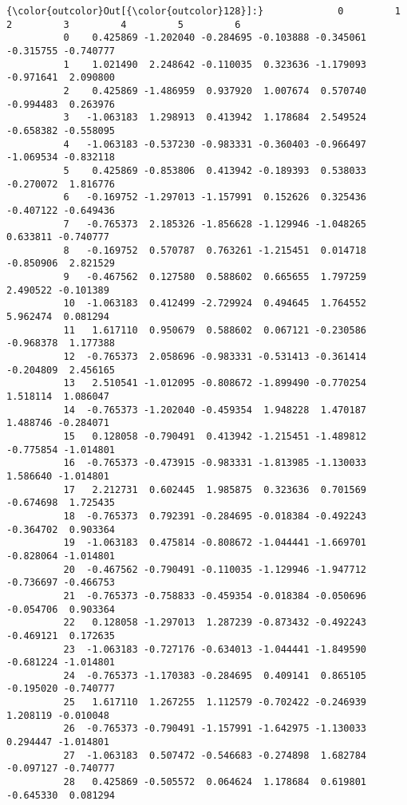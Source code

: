 \documentclass[11pt]{article}
\begin{document}
\begin{Verbatim}[commandchars=\\\{\}]
{\color{outcolor}Out[{\color{outcolor}128}]:}             0         1         2         3         4         5         6
          0    0.425869 -1.202040 -0.284695 -0.103888 -0.345061 -0.315755 -0.740777
          1    1.021490  2.248642 -0.110035  0.323636 -1.179093 -0.971641  2.090800
          2    0.425869 -1.486959  0.937920  1.007674  0.570740 -0.994483  0.263976
          3   -1.063183  1.298913  0.413942  1.178684  2.549524 -0.658382 -0.558095
          4   -1.063183 -0.537230 -0.983331 -0.360403 -0.966497 -1.069534 -0.832118
          5    0.425869 -0.853806  0.413942 -0.189393  0.538033 -0.270072  1.816776
          6   -0.169752 -1.297013 -1.157991  0.152626  0.325436 -0.407122 -0.649436
          7   -0.765373  2.185326 -1.856628 -1.129946 -1.048265  0.633811 -0.740777
          8   -0.169752  0.570787  0.763261 -1.215451  0.014718 -0.850906  2.821529
          9   -0.467562  0.127580  0.588602  0.665655  1.797259  2.490522 -0.101389
          10  -1.063183  0.412499 -2.729924  0.494645  1.764552  5.962474  0.081294
          11   1.617110  0.950679  0.588602  0.067121 -0.230586 -0.968378  1.177388
          12  -0.765373  2.058696 -0.983331 -0.531413 -0.361414 -0.204809  2.456165
          13   2.510541 -1.012095 -0.808672 -1.899490 -0.770254  1.518114  1.086047
          14  -0.765373 -1.202040 -0.459354  1.948228  1.470187  1.488746 -0.284071
          15   0.128058 -0.790491  0.413942 -1.215451 -1.489812 -0.775854 -1.014801
          16  -0.765373 -0.473915 -0.983331 -1.813985 -1.130033  1.586640 -1.014801
          17   2.212731  0.602445  1.985875  0.323636  0.701569 -0.674698  1.725435
          18  -0.765373  0.792391 -0.284695 -0.018384 -0.492243 -0.364702  0.903364
          19  -1.063183  0.475814 -0.808672 -1.044441 -1.669701 -0.828064 -1.014801
          20  -0.467562 -0.790491 -0.110035 -1.129946 -1.947712 -0.736697 -0.466753
          21  -0.765373 -0.758833 -0.459354 -0.018384 -0.050696 -0.054706  0.903364
          22   0.128058 -1.297013  1.287239 -0.873432 -0.492243 -0.469121  0.172635
          23  -1.063183 -0.727176 -0.634013 -1.044441 -1.849590 -0.681224 -1.014801
          24  -0.765373 -1.170383 -0.284695  0.409141  0.865105 -0.195020 -0.740777
          25   1.617110  1.267255  1.112579 -0.702422 -0.246939  1.208119 -0.010048
          26  -0.765373 -0.790491 -1.157991 -1.642975 -1.130033  0.294447 -1.014801
          27  -1.063183  0.507472 -0.546683 -0.274898  1.682784 -0.097127 -0.740777
          28   0.425869 -0.505572  0.064624  1.178684  0.619801 -0.645330  0.081294

\end{Verbatim}
\end{document}
